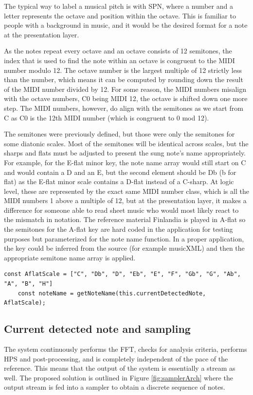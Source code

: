 The typical way to label a musical pitch is with SPN, where a number and a letter represents the octave and position within the octave. This is familiar to people with a background in music, and it would be the desired format for a note at the presentation layer.

As the notes repeat every octave and an octave consists of 12 semitones, the index that is used to find the note within an octave is congruent to the MIDI number modulo 12. The octave number is the largest multiple of 12 strictly less than the number, which means it can be computed by rounding down the result of the MIDI number divided by 12. For some reason, the MIDI numbers misalign with the octave numbers, C0 being MIDI 12, the octave is shifted down one more step. The MIDI numbers, however, do align with the semitones as we start from C as C0 is the 12th MIDI number (which is congruent to 0 mod 12).



The semitones were previously defined, but those were only the semitones for some diatonic scales. Most of the semitones will be identical across scales, but the sharps and flats must be adjusted to present the sung note's name appropriately. For example, for the E-flat minor key, the note name array would still start on C and would contain a D and an E, but the second element should be Db (b for flat) as the E-flat minor scale contains a D-flat instead of a C-sharp. At logic level, these are represented by the exact same MIDI number class, which is all the MIDI numbers 1 above a multiple of 12, but at the presentation layer, it makes a difference for someone able to read sheet music who would most likely react to the mismatch in notation. The reference material Finlandia is played in A-flat so the semitones for the A-flat key are hard coded in the application for testing purposes but parameterized for the note name function. In a proper application, the key could be inferred from the source (for example musicXML) and then the appropriate semitone name array is applied.

\begin{lstlisting}[style=javascript]
    const AflatScale = ["C", "Db", "D", "Eb", "E", "F", "Gb", "G", "Ab", "A", "B", "H"]
    const noteName = getNoteName(this.currentDetectedNote, AflatScale);
\end{lstlisting}

\subsection{Current detected note and sampling}
The system continuously performs the FFT, checks for analysis criteria, performs HPS and post-processing, and is completely independent of the pace of the reference. This means that the output of the system is essentially a stream as well. The proposed solution is outlined in Figure \ref{fig:samplerArch} where the output stream is fed into a sampler to obtain a discrete sequence of notes. 

